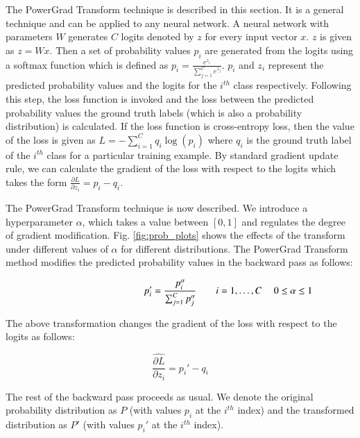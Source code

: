 \documentclass[times,sort&compress]{elsarticle}
\begin{document}
The PowerGrad Transform technique is described in this section. It is a general
technique and can be applied to any neural network. A neural network with parameters $W$
generates $C$ logits denoted by $z$ for every input vector $x$. $z$ is given as $z=Wx$.
Then a set of probability values $p_i$ are generated from the logits using a softmax
function which is defined as $p_i=\frac{e^{z_i}}{\sum _{j=1}^C e^{z_j}}$. $p_i$ and
$z_i$ represent the predicted probability values and the logits for the $i^{th}$ class
respectively. Following this step, the loss function is invoked and the loss between the
predicted probability values the ground truth labels (which is also a probability
distribution) is calculated. If the loss function is cross-entropy loss, then the value
of the loss is given as $L=-\sum _{i=1}^C q_i \log \left(p_i\right)$ where $q_i$ is the
ground truth label of the $i^{th}$ class for a particular training example. By standard
gradient update rule, we can calculate the gradient of the loss with respect to the
logits which takes the form $\frac{\partial L}{\partial z_i}=p_i-q_i$.

The PowerGrad Transform technique is now described. We introduce a hyperparameter
$\alpha$, which takes a value between $[0, 1]$ and regulates the degree of gradient
modification. Fig. \ref{fig:prob_plots} shows the effects of the transform under
different values of $\alpha$ for different distributions. The PowerGrad Transform method
modifies the predicted probability values in the backward pass as follows:

\begin{equation} \hspace*{3.5cm} p_i'=\frac{p_i^{\alpha }}{\sum _{j=1}^C
p_j^\alpha} \ \ \ \ \ \ \ \ i=1,\dots,C\ \ \ \ \ 0 \leq \alpha\leq 1
\label{transformed_probabilities} \end{equation}

The above transformation changes the gradient of the loss with respect to the logits as
follows:

\begin{equation} \widehat{\frac{\partial L}{\partial z_i}}=p_i'-q_i
\label{PGT_logit_derivative}
\end{equation}

The rest of the backward pass proceeds as usual. We denote the original probability
distribution as $P$ (with values $p_i$ at the $i^{th}$ index) and the transformed
distribution as $P'$ (with values $p_i'$ at the $i^{th}$ index).
\end{document}
